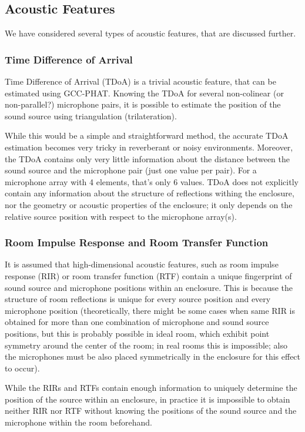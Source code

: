 \documentclass[applsci,article,submit,moreauthors,pdftex]{Definitions/mdpi}
\begin{document}
\subsection{Acoustic Features}
We have considered several types of acoustic features, that are discussed further.

\subsubsection{Time Difference of Arrival}
Time Difference of Arrival (TDoA) is a trivial acoustic feature, that can be estimated using GCC-PHAT. Knowing the TDoA for several non-colinear (or non-parallel?) microphone pairs, it is possible to estimate the position of the sound source using triangulation (trilateration).

While this would be a simple and straightforward method, the accurate TDoA estimation becomes very tricky in reverberant or noisy environments. Moreover, the TDoA contains only very little information about the distance between the sound source and the microphone pair (just one value per pair). For a microphone array with 4 elements, that's only 6 values. TDoA does not explicitly contain any information about the structure of reflections withing the enclosure, nor the geometry or acoustic properties of the enclosure; it only depends on the relative source position with respect to the microphone array(s).

\subsubsection{Room Impulse Response and Room Transfer Function}
It is assumed that high-dimensional acoustic features, such as room impulse response (RIR) or room transfer function (RTF) contain a unique fingerprint of sound source and microphone positions within an enclosure. This is because the structure of room reflections is unique for every source position and every microphone position (theoretically, there might be some cases when same RIR is obtained for more than one combination of microphone and sound source positions, but this is probably possible in ideal room, which exhibit point symmetry around the center of the room; in real rooms this is impossible; also the microphones must be also placed symmetrically in the enclosure for this effect to occur).

While the RIRs and RTFs contain enough information to uniquely determine the position of the source within an enclosure, in practice it is impossible to obtain neither RIR nor RTF without knowing the positions of the sound source and the microphone within the room beforehand.
\end{document}
